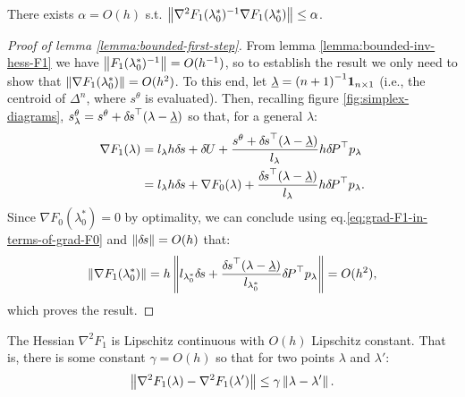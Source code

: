 \documentclass[smallcondensed]{svjour3}
\begin{document}
\begin{lemma}\label{lemma:bounded-first-step}
  There exists $\alpha = O(h)$ s.t.
  $\left\|\nabla^2 F_1(\lambda_{0}^*)^{-1} \nabla F_1(\lambda_{0}^*)\right\|
  \leq \alpha$.
\end{lemma}

\begin{proof}[Proof of lemma \ref{lemma:bounded-first-step}]
  From lemma \ref{lemma:bounded-inv-hess-F1} we have
  $\left\|F_1(\lambda_0^*)^{-1}\right\| = O(h^{-1})$, so to establish the
  result we only need to show that
  $\left\|\nabla F_1(\lambda_0^*)\right\| = O(h^2)$. To this end, let
  $\underline{\lambda} = {(n + 1)}^{-1} \boldsymbol{1}_{n \times 1}$ (i.e., the
  centroid of $\Delta^n$, where $s^\theta$ is evaluated). Then,
  recalling figure \ref{fig:simplex-diagrams},
  $s^\theta_\lambda = s^\theta + {\delta \hspace{-0.1em} s}^\top (\lambda -
  \underline{\lambda})$ so that, for a general $\lambda$:
  \begin{equation}\label{eq:grad-F1-in-terms-of-grad-F0}
    \begin{aligned}
      \nabla F_1(\lambda) &= l_\lambda h {\delta \hspace{-0.1em} s} + {\delta \hspace{-0.09em} U} + \frac{s^\theta + {\delta \hspace{-0.1em} s}^\top (\lambda - \underline{\lambda})}{l_\lambda} h {\delta \hspace{-0.14em} P}^\top p_\lambda \\
      &= l_\lambda h {\delta \hspace{-0.1em} s} + \nabla F_0(\lambda) + \frac{{\delta \hspace{-0.1em} s}^\top {(\lambda - \underline{\lambda})}}{l_\lambda} h {\delta \hspace{-0.14em} P}^\top p_\lambda.
    \end{aligned}
  \end{equation}
  Since $\nabla F_0(\lambda_0^*) = 0$ by optimality, we can conclude
  using eq.\@ \ref{eq:grad-F1-in-terms-of-grad-F0} and
  $\left\|{\delta \hspace{-0.1em} s}\right\| = O(h)$ that:
  \begin{equation}
    \left\|\nabla F_1(\lambda_0^*)\right\| = h \left\|l_{\lambda_0^*} {\delta \hspace{-0.1em} s} + \frac{{\delta \hspace{-0.1em} s}^\top {(\lambda - \underline{\lambda})}}{l_{\lambda_0^*}} {\delta \hspace{-0.14em} P}^\top p_\lambda\right\| = O(h^2),
  \end{equation}
  which proves the result.
\end{proof}

\begin{lemma}\label{lemma:hess-F1-lipschitz}
  The Hessian $\nabla^2 F_1$ is Lipschitz continuous with $O(h)$
  Lipschitz constant. That is, there is some constant $\gamma = O(h)$
  so that for two points $\lambda$ and $\lambda'$:
  \begin{align*}
    \left\|\nabla^2 F_1(\lambda) - \nabla^2 F_1(\lambda')\right\| \leq \gamma \left\|\lambda - \lambda'\right\|.
  \end{align*}
\end{lemma}
\end{document}
